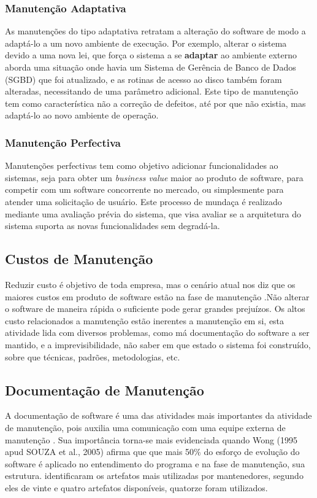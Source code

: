 \subsubsection{Manutenção Adaptativa}
As manutenções do tipo adaptativa retratam a alteração do software de modo a adaptá-lo a um novo ambiente de execução. Por exemplo, alterar o sistema devido a uma nova lei, que força o sistema a se \textbf{adaptar} ao ambiente externo  aborda uma situação onde havia um Sistema de  Gerência de Banco de Dados (SGBD) que foi atualizado, e as rotinas de acesso ao disco também foram alteradas, necessitando de uma parâmetro adicional. Este tipo de manutenção tem como característica não a correção de defeitos, até por que não existia, mas adaptá-lo ao novo ambiente de operação.
\subsubsection{Manutenção Perfectiva}
Manutenções perfectivas tem como objetivo adicionar funcionalidades ao sistemas, seja para obter um \textit{business value} maior ao produto de software, para competir com um software concorrente no mercado, ou simplesmente para atender uma solicitação de usuário. Este processo de mundaça é realizado mediante uma avaliação prévia  do sistema, que visa avaliar se a arquitetura do sistema suporta as novas funcionalidades sem degradá-la.
\subsection{Custos de Manutenção}
Reduzir custo é objetivo de toda empresa, mas o cenário atual nos diz que os maiores custos em produto de software estão na fase de manutenção \cite{pigoski1997}.Não alterar o software de maneira rápida o suficiente pode gerar grandes prejuízos. Os altos custo relacionados a manutenção estão inerentes a manutenção em si, esta atividade lida com diversos problemas, como má documentação do software a ser mantido, e a imprevisibilidade, não saber em que estado o sistema foi construído, sobre que técnicas, padrões, metodologias, etc. 
\subsection{Documentação de Manutenção}
A documentação de software é uma das atividades mais importantes da atividade de manutenção, pois auxilia uma comunicação com uma equipe externa de manutenção \cite{sergio2005}. Sua importância torna-se mais evidenciada quando Wong (1995 apud SOUZA et al., 2005) afirma que que mais 50\% do esforço de evolução do software é aplicado no entendimento do programa e na fase de manutenção, sua estrutura.  identificaram os artefatos mais utilizadas por mantenedores, segundo eles de vinte e quatro artefatos disponíveis, quatorze foram utilizados.


